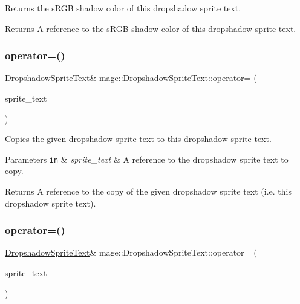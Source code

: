 Returns the s\+R\+GB shadow color of this dropshadow sprite text.

\begin{DoxyReturn}{Returns}
A reference to the s\+R\+GB shadow color of this dropshadow sprite text. 
\end{DoxyReturn}
\hypertarget{classmage_1_1_dropshadow_sprite_text_a83846227264396ee5b6ca44304bc404a}{}\label{classmage_1_1_dropshadow_sprite_text_a83846227264396ee5b6ca44304bc404a} 
\subsubsection{\texorpdfstring{operator=()}{operator=()}\hspace{0.1cm}{\footnotesize\ttfamily [1/2]}}
{\footnotesize\ttfamily \hyperlink{classmage_1_1_dropshadow_sprite_text}{Dropshadow\+Sprite\+Text}\& mage\+::\+Dropshadow\+Sprite\+Text\+::operator= (\begin{DoxyParamCaption}\item[{const \hyperlink{classmage_1_1_dropshadow_sprite_text}{Dropshadow\+Sprite\+Text} \&}]{sprite\+\_\+text }\end{DoxyParamCaption})\hspace{0.3cm}{\ttfamily [delete]}}

Copies the given dropshadow sprite text to this dropshadow sprite text.


\begin{DoxyParams}[1]{Parameters}
\mbox{\tt in}  & {\em sprite\+\_\+text} & A reference to the dropshadow sprite text to copy. \\
\hline
\end{DoxyParams}
\begin{DoxyReturn}{Returns}
A reference to the copy of the given dropshadow sprite text (i.\+e. this dropshadow sprite text). 
\end{DoxyReturn}
\hypertarget{classmage_1_1_dropshadow_sprite_text_aea70f005fd9eae94aee9da27aa54534b}{}\label{classmage_1_1_dropshadow_sprite_text_aea70f005fd9eae94aee9da27aa54534b} 
\subsubsection{\texorpdfstring{operator=()}{operator=()}\hspace{0.1cm}{\footnotesize\ttfamily [2/2]}}
{\footnotesize\ttfamily \hyperlink{classmage_1_1_dropshadow_sprite_text}{Dropshadow\+Sprite\+Text}\& mage\+::\+Dropshadow\+Sprite\+Text\+::operator= (\begin{DoxyParamCaption}\item[{\hyperlink{classmage_1_1_dropshadow_sprite_text}{Dropshadow\+Sprite\+Text} \&\&}]{sprite\+\_\+text }\end{DoxyParamCaption})\hspace{0.3cm}{\ttfamily [delete]}}

